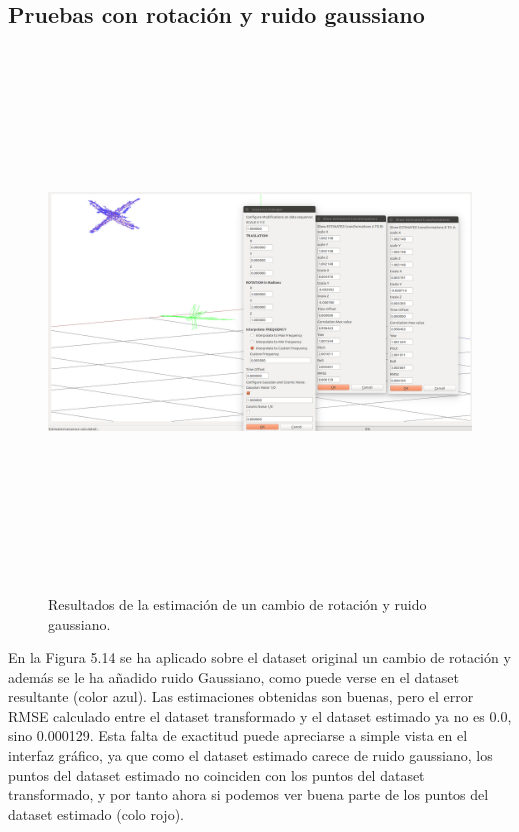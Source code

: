 \subsection{Pruebas con rotación y ruido gaussiano}
\begin{figure}[H]
\begin{center}
\label{fig:opciones de View}\includegraphics[height=14.0cm,width=18.0cm]{img/cap6/Rota_GaussNoise_abba.png}
\hspace{0.5cm}

\end{center}

\caption{Resultados de la estimación de un cambio de rotación y ruido gaussiano.}
\end{figure}
En la Figura 5.14 se ha aplicado sobre el dataset original un cambio de rotación y además se le ha añadido ruido Gaussiano, como puede verse en el dataset resultante (color azul). Las estimaciones obtenidas son buenas, pero el error RMSE calculado entre el dataset transformado y el dataset estimado ya no es 0.0, sino 0.000129. Esta falta de exactitud puede apreciarse a simple vista en el interfaz gráfico, ya que como el dataset estimado carece de ruido gaussiano, los puntos del dataset estimado no coinciden con los puntos del dataset transformado, y por tanto ahora si podemos ver buena parte de los puntos del dataset estimado (colo rojo).


